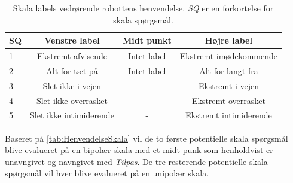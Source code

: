 \begin{table}[H]
	\centering
	\begin{tabular}{l|c|c|c}
		SQ     & Venstre label & Midt punkt & Højre label \\\hline
		1   & Ekstremt afvisende & Intet label & Ekstremt imødekommende         \\\hline
		2   & Alt for tæt på & Intet label & Alt for langt fra   \\\hline
		3   & Slet ikke i vejen & -  & Ekstremt i vejen  \\\hline
	 	4   & Slet ikke overrasket &  -  & Ekstremt overrasket \\\hline
		5   & Slet ikke intimiderende & - & Ekstremt intimiderende           
	\end{tabular}
	\caption{Skala labels vedrørende robottens henvendelse. \textit{SQ} er en forkortelse for skala spørgsmål.}
	\label{tab:HenvendelseSkala} 
\end{table}
\noindent
%
Baseret på \autoref{tab:HenvendelseSkala} vil de to første potentielle skala spørgsmål blive evalueret på en bipolær skala med et midt punk som henholdvist er unavngivet og navngivet med \textit{Tilpas}. De tre resterende potentielle skala spørgsmål vil hver blive evalueret på en unipolær skala.
\newpage
%
